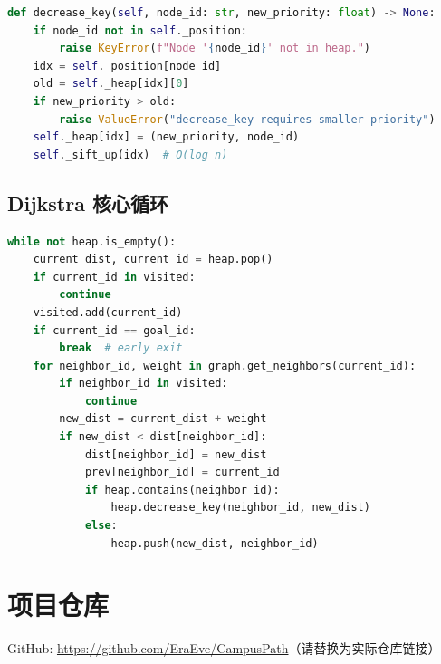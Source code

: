 \documentclass[11pt,a4paper]{ctexart}
\begin{document}
\begin{lstlisting}[language=Python]
def decrease_key(self, node_id: str, new_priority: float) -> None:
    if node_id not in self._position:
        raise KeyError(f"Node '{node_id}' not in heap.")
    idx = self._position[node_id]
    old = self._heap[idx][0]
    if new_priority > old:
        raise ValueError("decrease_key requires smaller priority")
    self._heap[idx] = (new_priority, node_id)
    self._sift_up(idx)  # O(log n)
\end{lstlisting}

\subsection{Dijkstra 核心循环}

\begin{lstlisting}[language=Python]
while not heap.is_empty():
    current_dist, current_id = heap.pop()
    if current_id in visited:
        continue
    visited.add(current_id)
    if current_id == goal_id:
        break  # early exit
    for neighbor_id, weight in graph.get_neighbors(current_id):
        if neighbor_id in visited:
            continue
        new_dist = current_dist + weight
        if new_dist < dist[neighbor_id]:
            dist[neighbor_id] = new_dist
            prev[neighbor_id] = current_id
            if heap.contains(neighbor_id):
                heap.decrease_key(neighbor_id, new_dist)
            else:
                heap.push(new_dist, neighbor_id)
\end{lstlisting}

\section{项目仓库}

GitHub: \url{https://github.com/EraEve/CampusPath}（请替换为实际仓库链接）
\end{document}
